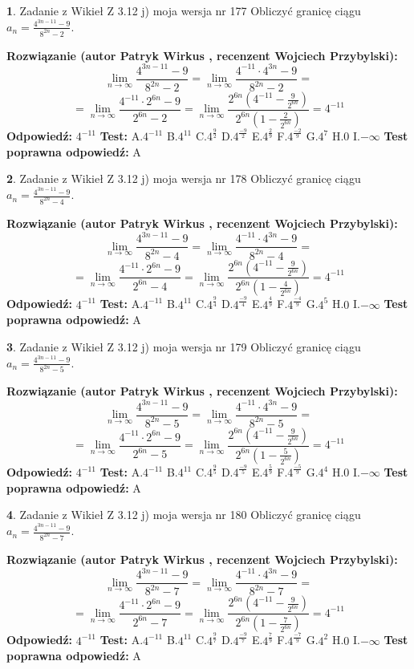 \documentclass[12pt, a4paper]{article}
\theoremstyle{definition} %
\newtheorem{zad}{}
\newcommand{\zadStart}[1]{\begin{zad}#1\newline}
\newcommand{\zadStop}{\end{zad}}
\newcommand{\rozwStart}[2]{\noindent \textbf{Rozwiązanie (autor #1 , recenzent #2): }\newline}
\newcommand{\rozwStop}{\newline}
\newcommand{\odpStart}{\noindent \textbf{Odpowiedź:}\newline}
\newcommand{\odpStop}{\newline}
\newcommand{\testStart}{\noindent \textbf{Test:}\newline}
\newcommand{\testStop}{\newline}
\newcommand{\kluczStart}{\noindent \textbf{Test poprawna odpowiedź:}\newline}
\newcommand{\kluczStop}{\newline}
\begin{document}
\zadStart{Zadanie z Wikieł Z 3.12 j) moja wersja nr 177}
Obliczyć granicę ciągu $a_{n}=\frac{4^{3n-11}-9}{8^{2n}-2}$.
\zadStop
\rozwStart{Patryk Wirkus}{Wojciech Przybylski}
$$\lim\limits_{n\to\infty}\frac{4^{3n-11}-9}{8^{2n}-2}= \lim\limits_{n\to\infty}\frac{4^{-11} \cdot 4^{3n}-9}{8^{2n}-2}=$$
$$= \lim\limits_{n\to\infty}\frac{4^{-11} \cdot 2^{6n}-9}{2^{6n}-2}= \lim\limits_{n\to\infty}\frac{2^{6n}(4^{-11} - \frac{9}{2^{6n}})}{2^{6n}(1-\frac{2}{2^{6n}})}= 4^{-11}$$
\rozwStop
\odpStart
$4^{-11}$
\odpStop
\testStart
A.$4^{-11}$
B.$4^{11}$
C.$4^{\frac{9}{2}}$
D.$4^{\frac{-9}{2}}$
E.$4^{\frac{2}{9}}$
F.$4^{\frac{-2}{9}}$
G.$4^{7}$
H.$0$
I.$-\infty$
\testStop
\kluczStart
A
\kluczStop



\zadStart{Zadanie z Wikieł Z 3.12 j) moja wersja nr 178}
Obliczyć granicę ciągu $a_{n}=\frac{4^{3n-11}-9}{8^{2n}-4}$.
\zadStop
\rozwStart{Patryk Wirkus}{Wojciech Przybylski}
$$\lim\limits_{n\to\infty}\frac{4^{3n-11}-9}{8^{2n}-4}= \lim\limits_{n\to\infty}\frac{4^{-11} \cdot 4^{3n}-9}{8^{2n}-4}=$$
$$= \lim\limits_{n\to\infty}\frac{4^{-11} \cdot 2^{6n}-9}{2^{6n}-4}= \lim\limits_{n\to\infty}\frac{2^{6n}(4^{-11} - \frac{9}{2^{6n}})}{2^{6n}(1-\frac{4}{2^{6n}})}= 4^{-11}$$
\rozwStop
\odpStart
$4^{-11}$
\odpStop
\testStart
A.$4^{-11}$
B.$4^{11}$
C.$4^{\frac{9}{4}}$
D.$4^{\frac{-9}{4}}$
E.$4^{\frac{4}{9}}$
F.$4^{\frac{-4}{9}}$
G.$4^{5}$
H.$0$
I.$-\infty$
\testStop
\kluczStart
A
\kluczStop



\zadStart{Zadanie z Wikieł Z 3.12 j) moja wersja nr 179}
Obliczyć granicę ciągu $a_{n}=\frac{4^{3n-11}-9}{8^{2n}-5}$.
\zadStop
\rozwStart{Patryk Wirkus}{Wojciech Przybylski}
$$\lim\limits_{n\to\infty}\frac{4^{3n-11}-9}{8^{2n}-5}= \lim\limits_{n\to\infty}\frac{4^{-11} \cdot 4^{3n}-9}{8^{2n}-5}=$$
$$= \lim\limits_{n\to\infty}\frac{4^{-11} \cdot 2^{6n}-9}{2^{6n}-5}= \lim\limits_{n\to\infty}\frac{2^{6n}(4^{-11} - \frac{9}{2^{6n}})}{2^{6n}(1-\frac{5}{2^{6n}})}= 4^{-11}$$
\rozwStop
\odpStart
$4^{-11}$
\odpStop
\testStart
A.$4^{-11}$
B.$4^{11}$
C.$4^{\frac{9}{5}}$
D.$4^{\frac{-9}{5}}$
E.$4^{\frac{5}{9}}$
F.$4^{\frac{-5}{9}}$
G.$4^{4}$
H.$0$
I.$-\infty$
\testStop
\kluczStart
A
\kluczStop



\zadStart{Zadanie z Wikieł Z 3.12 j) moja wersja nr 180}
Obliczyć granicę ciągu $a_{n}=\frac{4^{3n-11}-9}{8^{2n}-7}$.
\zadStop
\rozwStart{Patryk Wirkus}{Wojciech Przybylski}
$$\lim\limits_{n\to\infty}\frac{4^{3n-11}-9}{8^{2n}-7}= \lim\limits_{n\to\infty}\frac{4^{-11} \cdot 4^{3n}-9}{8^{2n}-7}=$$
$$= \lim\limits_{n\to\infty}\frac{4^{-11} \cdot 2^{6n}-9}{2^{6n}-7}= \lim\limits_{n\to\infty}\frac{2^{6n}(4^{-11} - \frac{9}{2^{6n}})}{2^{6n}(1-\frac{7}{2^{6n}})}= 4^{-11}$$
\rozwStop
\odpStart
$4^{-11}$
\odpStop
\testStart
A.$4^{-11}$
B.$4^{11}$
C.$4^{\frac{9}{7}}$
D.$4^{\frac{-9}{7}}$
E.$4^{\frac{7}{9}}$
F.$4^{\frac{-7}{9}}$
G.$4^{2}$
H.$0$
I.$-\infty$
\testStop
\kluczStart
A
\kluczStop
\end{document}
